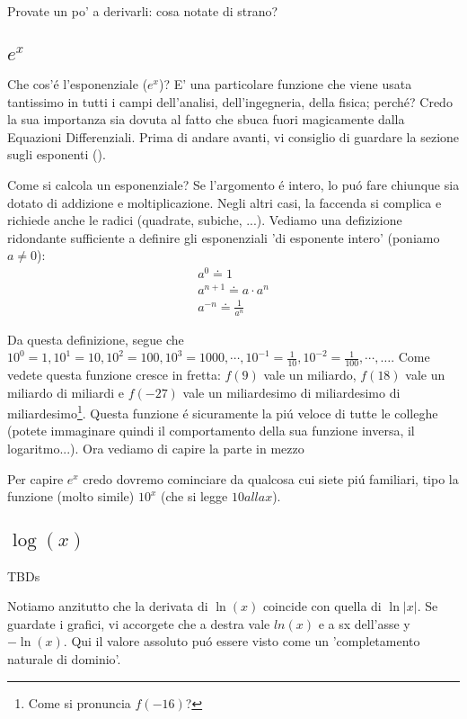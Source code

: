 Provate un po' a derivarli: cosa notate di strano? 

\subsection{$e^x$}

Che cos'\'e l'esponenziale ($e^x$)? E' una particolare funzione che viene usata tantissimo in tutti i campi dell'analisi, dell'ingegneria, della fisica; perch\'e?
Credo la sua importanza sia dovuta al fatto che sbuca fuori magicamente dalla Equazioni Differenziali. Prima di andare avanti, vi consiglio di guardare la sezione
sugli esponenti ().

Come si calcola un esponenziale? Se l'argomento \'e intero, lo pu\'o fare chiunque sia dotato di addizione e moltiplicazione. Negli altri casi, la faccenda si
complica e richiede anche le radici (quadrate, subiche, ...). Vediamo una defizizione ridondante sufficiente a definire gli esponenziali 'di esponente intero' (poniamo $a \ne 0$):
\begin{eqnarray}
a^0 \doteq 1\\
a^{n+1} \doteq a \cdot a^n\\
a^{-n} \doteq \frac{1}{a^n}
\end{eqnarray}
 
 Da questa definizione, segue che $10^0=1, 10^1=10, 10^2=100, 10^3=1000, \cdots, 10^{-1}=\frac{1}{10},10^{-2}=\frac{1}{100}, \cdots, \ldots$. Come vedete questa funzione cresce in fretta: $f(9)$ vale un miliardo, $f(18)$ vale un miliardo di miliardi e $f(-27)$ vale un miliardesimo di miliardesimo di miliardesimo\footnote{Come si pronuncia $f(-16)$?}. 
 Questa funzione \'e sicuramente la pi\'u veloce di tutte le colleghe (potete immaginare quindi il comportamento della sua funzione inversa, il logaritmo...). Ora vediamo di capire la parte in mezzo
 
Per capire $e^x$ credo dovremo cominciare da qualcosa cui siete pi\'u familiari, tipo la funzione (molto simile) $10^x$ (che si legge $10 alla x$). 

\subsection{$\log(x)$}

TBDs 

Notiamo anzitutto che la derivata di $\ln(x)$ coincide con quella di $\ln|x|$. Se guardate i grafici,
vi accorgete che a destra vale $ln(x)$ e a sx dell'asse y $-\ln(x)$. Qui il valore assoluto pu\'o essere visto come un 'completamento naturale di dominio'.

